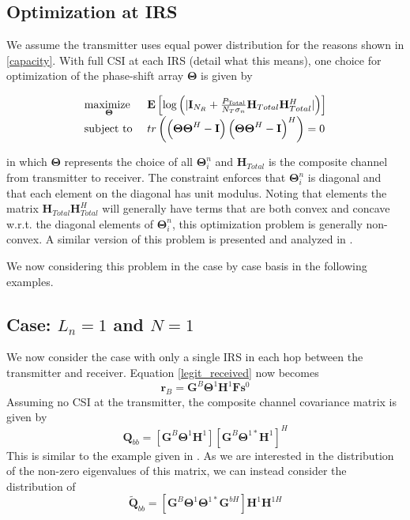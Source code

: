 \documentclass[12pt,a4paper]{report}
\begin{document}
\subsection{Optimization at IRS}
We assume the transmitter uses equal power distribution for the reasons shown in \ref{capacity}. With full CSI at each IRS (detail what this means), one choice for optimization of the phase-shift array $\boldsymbol{\Theta}$ is given by 

    \begin{equation}
    \begin{array}{ll}
    \underset{\boldsymbol{\Theta}}{\text{maximize }}   & \mathop{\bf E{}}\left[\text{log{}}\left(|\mathbf{I}_{N_R}+\frac{P_{\text{Total}}}{N_T \sigma_n}\mathbf{H}_{Total}\mathbf{H}_{Total}^H|\right)\right]
    \\
    \mbox{subject to } & tr\left(
    \left(\boldsymbol{\Theta}\boldsymbol{\Theta}^H - \mathbf{I}  \right)
    \left(\boldsymbol{\Theta}\boldsymbol{\Theta}^H - \mathbf{I}  \right)^H
    \right) = 0
    \end{array}
    \label{general_irs_opt}
    \end{equation}

in which $\boldsymbol{\Theta}$ represents the choice of all $\boldsymbol{\Theta}^n_i$ and $\mathbf{H}_{Total}$ is the composite channel from transmitter to receiver. The constraint enforces that $\boldsymbol{\Theta}^n_i$ is diagonal and that each element on the diagonal has unit modulus. 
Noting that elements the matrix  $\mathbf{H}_{Total}\mathbf{H}_{Total}^H$ will generally have terms that are both convex and concave w.r.t. the diagonal elements of $\boldsymbol{\Theta}^n_i$, this optimization problem is generally non-convex. A similar version of this problem is presented and analyzed in \cite{wu2019intelligent}.
\par
We now considering this problem in the case by case basis in the following examples. 


\subsection{Case: $L_n=1$ and $N=1$}
We now consider the case with only a single IRS in each hop between the transmitter and receiver. 
Equation \ref{legit_received} now becomes 
	\begin{equation}
\mathbf{r}_{B} =  \mathbf{G}^{B}\boldsymbol{\Theta}^{1}\mathbf{H}^{1}\mathbf{F}\mathbf{s}^0
\end{equation}
Assuming no CSI at the transmitter, the composite channel covariance matrix is given by 
\begin{equation}
\mathbf{Q}_{bb} = [\mathbf{G}^{B}\boldsymbol{\Theta}^{1}\mathbf{H}^{1}][\mathbf{G}^{B}\boldsymbol{\Theta}^{1*}\mathbf{H}^{1}]^H
\end{equation}
This is similar to the example given in \cite[Section 4.10]{muller2013applications}. As we are interested in the distribution of the non-zero eigenvalues of this matrix, we can instead consider the distribution of 
\begin{equation}
\tilde{\mathbf{Q}}_{bb} = [\mathbf{G}^{B}\boldsymbol{\Theta}^{1} \boldsymbol{\Theta}^{1*}\mathbf{G}^{bH}]\mathbf{H}^{1}\mathbf{H}^{1H}
\end{equation}
\end{document}
